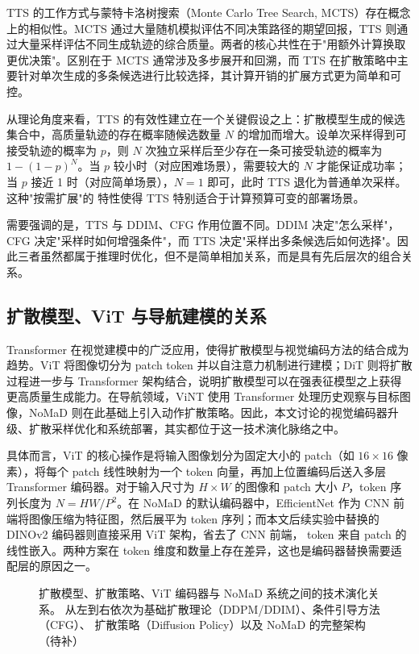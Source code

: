 TTS 的工作方式与蒙特卡洛树搜索（Monte Carlo Tree Search, MCTS）存在概念上的相似性。MCTS 通过大量随机模拟评估不同决策路径的期望回报，TTS 则通过大量采样评估不同生成轨迹的综合质量。两者的核心共性在于"用额外计算换取更优决策"。区别在于 MCTS 通常涉及多步展开和回溯，而 TTS 在扩散策略中主要针对单次生成的多条候选进行比较选择，其计算开销的扩展方式更为简单和可控。

从理论角度来看，TTS 的有效性建立在一个关键假设之上：扩散模型生成的候选集合中，高质量轨迹的存在概率随候选数量 $N$ 的增加而增大。设单次采样得到可接受轨迹的概率为 $p$，则 $N$ 次独立采样后至少存在一条可接受轨迹的概率为 $1 - (1-p)^N$。当 $p$ 较小时（对应困难场景），需要较大的 $N$ 才能保证成功率；当 $p$ 接近 1 时（对应简单场景），$N=1$ 即可，此时 TTS 退化为普通单次采样。这种"按需扩展"的
特性使得 TTS 特别适合于计算预算可变的部署场景。

需要强调的是，TTS 与 DDIM、CFG 作用位置不同。DDIM 决定"怎么采样"，CFG 决定"采样时如何增强条件"，而 TTS 决定"采样出多条候选后如何选择"。因此三者虽然都属于推理时优化，但不是简单相加关系，而是具有先后层次的组合关系。

\subsection{扩散模型、ViT 与导航建模的关系}

Transformer 在视觉建模中的广泛应用，使得扩散模型与视觉编码方法的结合成为趋势。ViT 将图像切分为 patch token 并以自注意力机制进行建模\cite{vit2020}；DiT 则将扩散过程进一步与 Transformer 架构结合，说明扩散模型可以在强表征模型之上获得更高质量生成能力\cite{dit2022}。在导航领域，ViNT 使用 Transformer 处理历史观察与目标图像\cite{vint2023}，NoMaD 则在此基础上引入动作扩散策略\cite{nomad2023}。因此，本文讨论的视觉编码器升级、扩散采样优化和系统部署，其实都位于这一技术演化脉络之中。

具体而言，ViT 的核心操作是将输入图像划分为固定大小的 patch（如 $16 \times 16$ 像素），将每个 patch 线性映射为一个 token 向量，再加上位置编码后送入多层 Transformer 编码器。对于输入尺寸为 $H \times W$ 的图像和 patch 大小 $P$，token 序列长度为 $N = HW/P^2$。在 NoMaD 的默认编码器中，EfficientNet 作为 CNN 前端将图像压缩为特征图，然后展平为 token 序列；而本文后续实验中替换的 DINOv2 编码器则直接采用 ViT 架构，省去了 CNN 前端，
token 来自 patch 的线性嵌入。两种方案在 token 维度和数量上存在差异，这也是编码器替换需要适配层的原因之一。

\begin{figure}[htbp]
    \centering
    \fbox{\rule{0pt}{55mm}\rule{0.82\linewidth}{0pt}}
    \caption{扩散模型、扩散策略、ViT 编码器与 NoMaD 系统之间的技术演化关系。
    从左到右依次为基础扩散理论（DDPM/DDIM）、条件引导方法（CFG）、
    扩散策略（Diffusion Policy）以及 NoMaD 的完整架构（待补）}
    \label{fig:prelim-diffusion-placeholder}
\end{figure}

